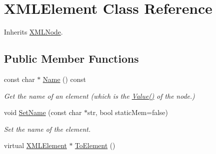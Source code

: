 \hypertarget{classtinyxml2_1_1_x_m_l_element}{\section{X\-M\-L\-Element Class Reference}
\label{classtinyxml2_1_1_x_m_l_element}
}


Inherits \hyperlink{classtinyxml2_1_1_x_m_l_node}{X\-M\-L\-Node}.

\subsection*{Public Member Functions}
\begin{DoxyCompactItemize}
\item 
\hypertarget{classtinyxml2_1_1_x_m_l_element_a6f8ea4f3037e8339cbd3e55d97ed08a9}{const char $\ast$ \hyperlink{classtinyxml2_1_1_x_m_l_element_a6f8ea4f3037e8339cbd3e55d97ed08a9}{Name} () const }\label{classtinyxml2_1_1_x_m_l_element_a6f8ea4f3037e8339cbd3e55d97ed08a9}

\begin{DoxyCompactList}\small\item\em Get the name of an element (which is the \hyperlink{classtinyxml2_1_1_x_m_l_node_a67ec54cde5ef8dac7901ad63544c6d44}{Value()} of the node.) \end{DoxyCompactList}\item 
\hypertarget{classtinyxml2_1_1_x_m_l_element_ab2d7d49a0c302478d3e39688255981a7}{void \hyperlink{classtinyxml2_1_1_x_m_l_element_ab2d7d49a0c302478d3e39688255981a7}{Set\-Name} (const char $\ast$str, bool static\-Mem=false)}\label{classtinyxml2_1_1_x_m_l_element_ab2d7d49a0c302478d3e39688255981a7}

\begin{DoxyCompactList}\small\item\em Set the name of the element. \end{DoxyCompactList}\item 
\hypertarget{classtinyxml2_1_1_x_m_l_element_a9ffc5156393163d4a637d194bcdb097b}{virtual \hyperlink{classtinyxml2_1_1_x_m_l_element}{X\-M\-L\-Element} $\ast$ \hyperlink{classtinyxml2_1_1_x_m_l_element_a9ffc5156393163d4a637d194bcdb097b}{To\-Element} ()}\label{classtinyxml2_1_1_x_m_l_element_a9ffc5156393163d4a637d194bcdb097b}


\end{DoxyCompactItemize}
